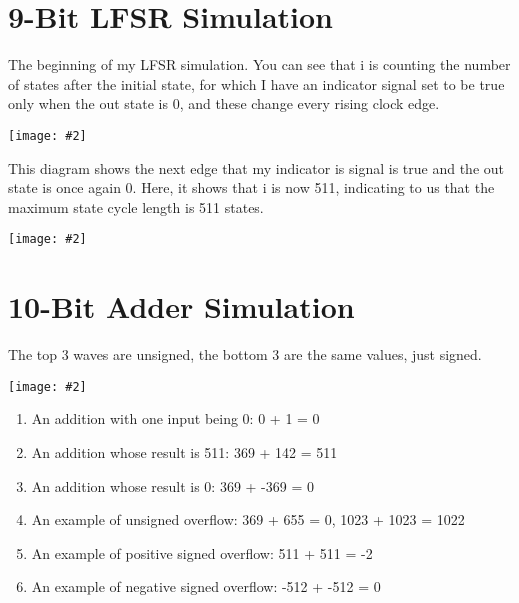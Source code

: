 \documentclass{article}
\newenvironment{solution}{\begin{mdframed}[style=SolutionFrame]}{\end{mdframed}}
\newcommand{\img}[2][1.0]{
    \begin{minipage}[t]{0.9\linewidth}
        \begin{center}
            \texttt{[image: \#2]}
        \end{center}
    \end{minipage}
}
\begin{document}
\newpage
\section{9-Bit LFSR Simulation}
    \begin{solution}
        The beginning of my LFSR simulation. You can see that i is counting the number of states after the initial state, for which I have an indicator signal set to be true only when the out state is 0, and these change every rising clock edge. \\
        \img[1.1]{lfsr_start.png}
        \clearpage
        This diagram shows the next edge that my indicator is signal is true and the out state is once again 0. Here, it shows that i is now 511, indicating to us that the maximum state cycle length is 511 states. \\
        \img[1.1]{lfsr_end.png}
    \end{solution}

\newpage
\section{10-Bit Adder Simulation}
    \begin{solution}
        The top 3 waves are unsigned, the bottom 3 are the same values, just signed. \\
        \img{adder_waves.png}
        \begin{enumerate}[label=\arabic*)]
            \item An addition with one input being 0: 0 + 1 = 0
            \item An addition whose result is 511: 369 + 142 = 511
            \item An addition whose result is 0: 369 + -369 = 0
            \item An example of unsigned overflow: 369 + 655 = 0, 1023 + 1023 = 1022
            \item An example of positive signed overflow: 511 + 511 = -2
            \item An example of negative signed overflow: -512 + -512 = 0
        \end{enumerate}
    \end{solution}

\newpage
\end{document}
